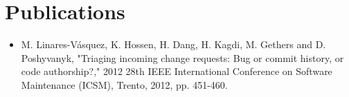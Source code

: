 \documentclass[letterpaper]{twentysecondcv} %
\begin{document}
\section{Publications}
\begin{itemize}
    \item M. Linares-Vásquez, K. Hossen, H. Dang, H. Kagdi, M. Gethers and D. Poshyvanyk, "Triaging incoming change requests: Bug or commit history, or code authorship?," 2012 28th IEEE International Conference on Software Maintenance (ICSM), Trento, 2012, pp. 451-460.
\end{itemize}
\end{document}
